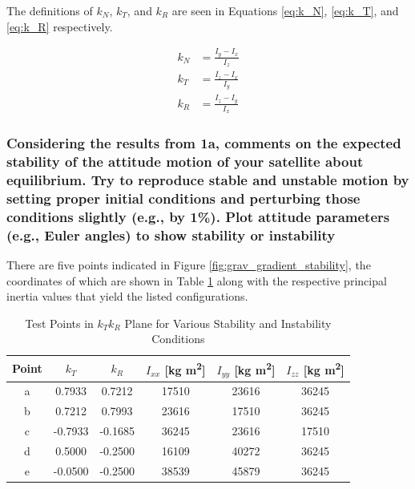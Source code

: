 The definitions of $k_N$, $k_T$, and $k_R$ are seen in Equations \ref{eq:k_N}, \ref{eq:k_T}, and \ref{eq:k_R} respectively. 

\begin{eqnarray}
    k_N &= \frac{I_y - I_x}{I_z} \label{eq:k_N} \\
    k_T &= \frac{I_z - I_x}{I_y} \label{eq:k_T} \\
    k_R &= \frac{I_z - I_y}{I_x} \label{eq:k_R}
\end{eqnarray}

\subsubsection{Considering the results from 1a, comments on the expected stability of the attitude motion of your satellite about equilibrium. Try to reproduce stable and unstable motion by setting proper initial conditions and perturbing those conditions slightly (e.g., by 1\%). Plot attitude parameters (e.g., Euler angles) to show stability or instability}

There are five points indicated in Figure \ref{fig:grav_gradient_stability}, the coordinates of which are shown in Table \ref{tab:k_plane_points} along with the respective principal inertia values that yield the listed configurations.

\begin{table}[H]
    \centering
    \captionsetup{justification = centering}
    \begin{tabular}{c|ccccc}
    Point  & $k_T$ & $k_R$ & $I_{xx}$ [kg m\textsuperscript{2}] & $I_{yy}$ [kg m\textsuperscript{2}] & $I_{zz}$ [kg m\textsuperscript{2}] \\ \hline
    a &   0.7933     &   0.7212    &   17510    &   23616    &  36245 \\
    b &   0.7212     &  0.7993     &   23616    &   17510    &  36245  \\  
    c &   -0.7933     &  -0.1685     &   36245    &   23616    &  17510  \\ 
    d &   0.5000     &  -0.2500     &   16109    &   40272    &  36245  \\ 
    e &   -0.0500     &  -0.2500     &   38539    &   45879    &  36245  \\ 
    \end{tabular}
    \caption{Test Points in $k_Tk_R$ Plane for Various Stability and Instability Conditions}
    \label{tab:k_plane_points}
\end{table}

